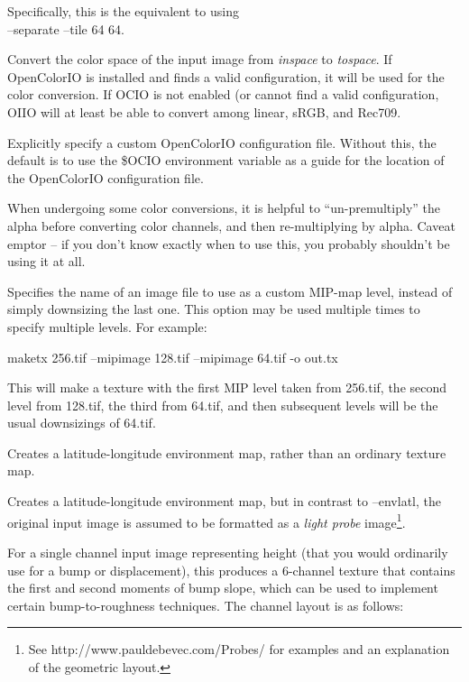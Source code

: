 Specifically, this is the equivalent to using \\
 {\cf --separate --tile 64 64}.
\apiend

Convert the color space of the input image from \emph{inspace} to
\emph{tospace}.  If OpenColorIO is installed and finds a valid
configuration, it will be used for the color conversion.  If OCIO
is not enabled (or cannot find a valid configuration, OIIO will at
least be able to convert among linear, sRGB, and Rec709.
\apiend

Explicitly specify a custom OpenColorIO configuration file. Without this,
the default is to use the {\cf \$OCIO} environment variable as a guide for
the location of the OpenColorIO configuration file.
\apiend

When undergoing some color conversions, it is helpful to
``un-premultiply'' the alpha before converting color channels, and then
re-multiplying by alpha.  Caveat emptor -- if you don't know exactly
when to use this, you probably shouldn't be using it at all.
\apiend


Specifies the name of an image file to use as a custom MIP-map level, 
instead of simply downsizing the last one.  This option may be used
multiple times to specify multiple levels.  For example:
\begin{code}
    maketx 256.tif --mipimage 128.tif --mipimage 64.tif -o out.tx
\end{code}
This will make a texture with the first MIP level taken from {\cf 256.tif},
the second level from {\cf 128.tif}, the third from {\cf 64.tif}, and
then subsequent levels will be the usual downsizings of {\cf 64.tif}.
\apiend

Creates a latitude-longitude environment map, rather than an ordinary
texture map.
\apiend

Creates a latitude-longitude environment map, but in contrast to
{\cf --envlatl}, the original input image is assumed to be formatted
as a \emph{light probe} image\footnote{See
{\cf http://www.pauldebevec.com/Probes/} for examples and an explanation
of the geometric layout.}.
\apiend

 
For a single channel input image representing height (that you would
ordinarily use for a bump or displacement), this produces a 6-channel
texture that contains the first and second moments of bump slope, which
can be used to implement certain bump-to-roughness techniques.
The channel layout is as follows:

